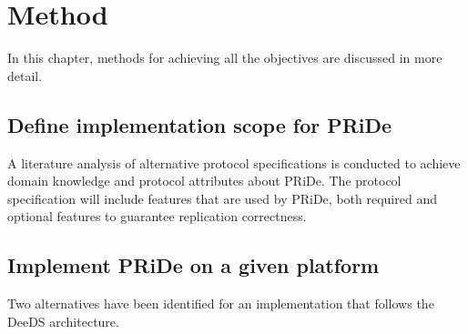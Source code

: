 
\section{Method} %
\label{sec:method}

In this chapter, methods for achieving all the objectives are discussed in more detail.

\subsection{Define implementation scope for PRiDe} 
\label{subsec:impl_bound}

A literature analysis of alternative protocol specifications is conducted to achieve domain knowledge and protocol attributes about PRiDe. The protocol specification will include features that are used by PRiDe, both required and optional features to guarantee replication correctness. 

\subsection{Implement PRiDe on a given platform} 
\label{subsec:create_implementation}

Two alternatives have been identified for an implementation that follows the DeeDS architecture.


